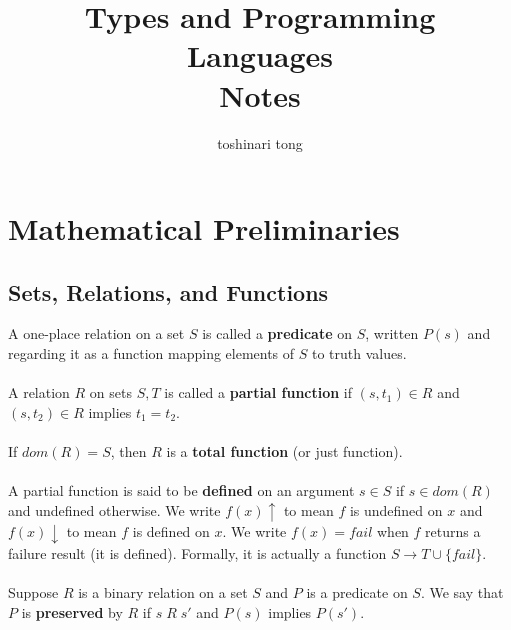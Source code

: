 \documentclass{article}
\title{Types and Programming Languages\\Notes}
\author{toshinari tong}
\begin{document}
\maketitle
\section{Mathematical Preliminaries}
\subsection{Sets, Relations, and Functions}
A one-place relation on a set \(S\) is called a \textbf{predicate} on \(S\), written \(P(s)\) and regarding it as a function mapping elements of \(S\) to truth values.\\\\
A relation \(R\) on sets \(S, T\) is called a \textbf{partial function} if \((s,t_{1})\in R\) and \((s,t_{2})\in R\) implies \(t_{1}=t_{2}\).\\\\
If \(dom(R)=S\), then \(R\) is a \textbf{total function} (or just function).\\\\
A partial function is said to be \textbf{defined} on an argument \(s\in S\) if \(s\in dom(R)\) and undefined otherwise.
We write \(f(x)\uparrow\) to mean \(f\) is undefined on \(x\) and \(f(x)\downarrow\) to mean \(f\) is defined on \(x\).
We write \(f(x)=fail\) when \(f\) returns a failure result (it is defined). Formally, it is actually a function \(S\to T\cup\{fail\}\).\\\\
Suppose \(R\) is a binary relation on a set \(S\) and \(P\) is a predicate on \(S\). We say that \(P\) is \textbf{preserved} by \(R\) if \(s\;R\; s'\) and \(P(s)\) implies \(P(s')\).
\end{document}
